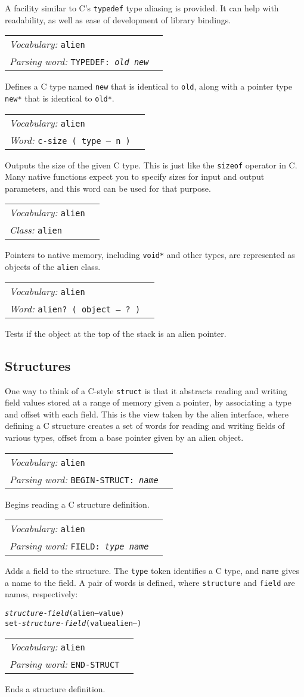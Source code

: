 \documentclass{book}
\newcommand{\vocabulary}[1]{\emph{Vocabulary:} \texttt{#1}&\\}
\newcommand{\parsingword}[2]{\index{\texttt{#1}}\emph{Parsing word:} \texttt{#2}&\\}
\newcommand{\ordinaryword}[2]{\index{\texttt{#1}}\emph{Word:} \texttt{#2}&\\}
\newcommand{\classword}[1]{\index{\texttt{#1}}\emph{Class:} \texttt{#1}&\\}
\newcommand{\predword}[1]{\ordinaryword{#1}{#1~( object -- ?~)}}
\newcommand{\wordtable}[1]{


\begin{tabularx}{12cm}{lX}
\hline
#1
\hline
\end{tabularx}

}
\begin{document}
A facility similar to C's \verb|typedef| type aliasing is provided. It can help with readability, as well as ease of development of library bindings.

\wordtable{
\vocabulary{alien}
\parsingword{TYPEDEF:}{TYPEDEF:~\emph{old} \emph{new}}
}
Defines a C type named \verb|new| that is identical to \verb|old|, along with a pointer type \verb|new*| that is identical to \verb|old*|.

\wordtable{
\vocabulary{alien}
\ordinaryword{c-size}{c-size ( type -- n )}
}
Outputs the size of the given C type. This is just like the \verb|sizeof| operator in C.
Many native functions expect you to specify sizes for input and output parameters, and
this word can be used for that purpose.

\wordtable{
\vocabulary{alien}
\classword{alien}
}
Pointers to native memory, including \verb|void*| and other types, are represented as objects of the \verb|alien| class.

\wordtable{
\vocabulary{alien}
\predword{alien?}
}
Tests if the object at the top of the stack is an alien pointer.

\subsection{Structures}\label{alien-structs}

One way to think of a C-style \verb|struct| is that it abstracts reading and writing field values stored at a range of memory given a pointer, by associating a type and offset with each field. This is the view taken by the alien interface, where defining a C structure creates a set of words for reading and writing fields of various types, offset from a base pointer given by an alien object.

\wordtable{
\vocabulary{alien}
\parsingword{BEGIN-STRUCT:}{BEGIN-STRUCT: \emph{name}}
}
Begins reading a C structure definition.
\wordtable{
\vocabulary{alien}
\parsingword{FIELD:}{FIELD: \emph{type} \emph{name}}
}
Adds a field to the structure. The \verb|type| token identifies a C type, and \verb|name| gives a name to the field. A pair of words is defined, where \verb|structure| and \verb|field| are names, respectively:
\begin{alltt}
\emph{structure}-\emph{field} ( alien -- value )
set-\emph{structure}-\emph{field} ( value alien -- )
\end{alltt}

\wordtable{
\vocabulary{alien}
\parsingword{END-STRUCT}{END-STRUCT}
}
Ends a structure definition.
\end{document}
